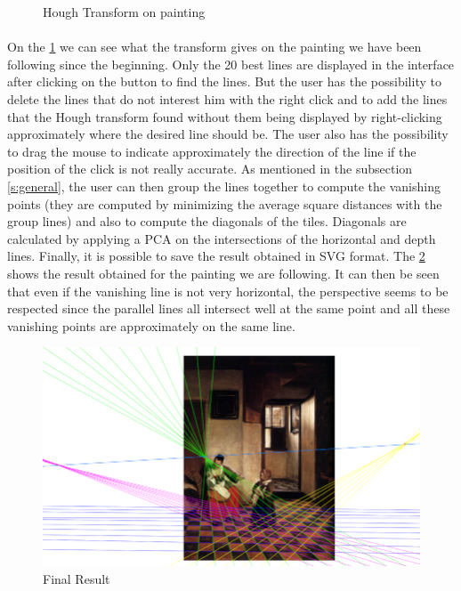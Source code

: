 \documentclass[11pt]{article}
\begin{document}
\begin{figure}[h]
		\caption{Hough Transform on painting}
		\label{im:hough}
	\end{figure}

	\paragraph{}
	On the \figurename \ref{im:hough} we can see what the transform gives on the painting we have been following since the beginning. Only the 20 best lines are displayed in the interface after clicking on the button to find the lines. But the user has the possibility to delete the lines that do not interest him with the right click and to add the lines that the Hough transform found without them being displayed by right-clicking approximately where the desired line should be. The user also has the possibility to drag the mouse to indicate approximately the direction of the line if the position of the click is not really accurate. As mentioned in the subsection \ref{s:general}, the user can then group the lines together to compute the vanishing points (they are computed by minimizing the average square distances with the group lines) and also to compute the diagonals of the tiles. Diagonals are calculated by applying a PCA \cite{pca} on the intersections of the horizontal and depth lines. Finally, it is possible to save the result obtained in SVG format. The \figurename \ref{im:final} shows the result obtained for the painting we are following. It can then be seen that even if the vanishing line is not very horizontal, the perspective seems to be respected since the parallel lines all intersect well at the same point and all these vanishing points are approximately on the same line.
	
	\begin{figure}[h]
		\centering
		\includegraphics[scale=2]{final.png}
		\caption{Final Result}
		\label{im:final}
	\end{figure}
\end{document}

